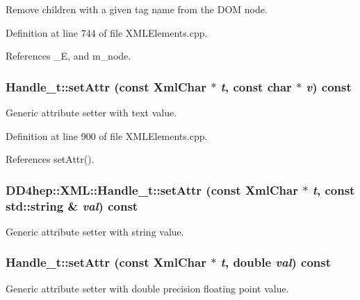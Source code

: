 Remove children with a given tag name from the DOM node. 

Definition at line 744 of file XMLElements.cpp.

References \_\-E, and m\_\-node.\hypertarget{class_d_d4hep_1_1_x_m_l_1_1_handle__t_ac7cfe57bdf20974d10144c69a2a52447}{
\subsubsection[{setAttr}]{ Handle\_\-t::setAttr (const {\bf XmlChar} $\ast$ {\em t}, \/  const char $\ast$ {\em v}) const}}
\label{class_d_d4hep_1_1_x_m_l_1_1_handle__t_ac7cfe57bdf20974d10144c69a2a52447}


Generic attribute setter with text value. 

Definition at line 900 of file XMLElements.cpp.

References setAttr().\hypertarget{class_d_d4hep_1_1_x_m_l_1_1_handle__t_a226d6ea145e4c0c42240f3205c8cfb8c}{
\subsubsection[{setAttr}]{ DD4hep::XML::Handle\_\-t::setAttr (const {\bf XmlChar} $\ast$ {\em t}, \/  const std::string \& {\em val}) const}}
\label{class_d_d4hep_1_1_x_m_l_1_1_handle__t_a226d6ea145e4c0c42240f3205c8cfb8c}


Generic attribute setter with string value. \hypertarget{class_d_d4hep_1_1_x_m_l_1_1_handle__t_a446c25314d97b2f60d7c68f1d6460360}{
\subsubsection[{setAttr}]{ Handle\_\-t::setAttr (const {\bf XmlChar} $\ast$ {\em t}, \/  double {\em val}) const}}
\label{class_d_d4hep_1_1_x_m_l_1_1_handle__t_a446c25314d97b2f60d7c68f1d6460360}


Generic attribute setter with double precision floating point value. 

